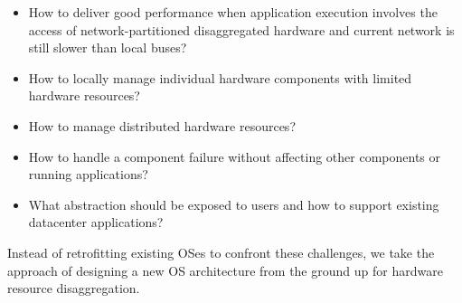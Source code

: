 \begin{itemize}
\item How to deliver good performance when application execution involves the access of network-partitioned disaggregated hardware
and current network is still slower than local buses?

\item How to locally manage individual hardware components with limited hardware resources?


\item How to manage distributed hardware resources?

\item How to handle a component failure without affecting other components or running applications?

\item What abstraction should be exposed to users and how to support existing datacenter applications?

\end{itemize}

Instead of retrofitting existing OSes to confront these challenges,
we take the approach of designing a new OS architecture from the ground up for hardware resource disaggregation.
